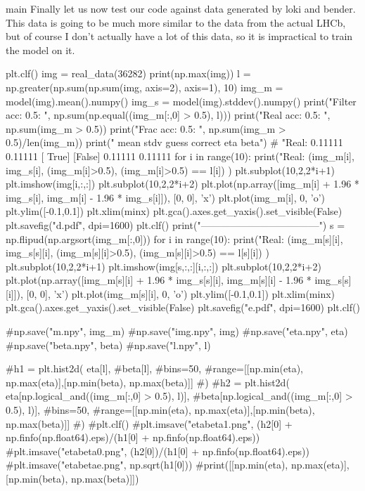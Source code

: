 \documentclass[10pt, a4paper]{article}
\begin{document}
\begin{codeblock}{main}
Finally let us now test our code against data generated by loki and bender. This data is going to be much more similar to the data from the actual LHCb, but of course I don't actually have a lot of this data, so it is impractical to train the model on it.

\begin{code}
	plt.clf()
	img = real_data(36282)
	print(np.max(img))
	l = np.greater(np.sum(np.sum(img, axis=2), axis=1), 10)
	img_m = model(img).mean().numpy()
	img_s = model(img).stddev().numpy()
	print("Filter acc: 0.5: ", np.sum(np.equal((img_m[:,0] > 0.5), l)))
	print("Real acc: 0.5: ", np.sum(img_m > 0.5))
	print("Frac acc: 0.5: ", np.sum(img_m > 0.5)/len(img_m))
	print("      mean    stdv    guess   correct eta     beta")
	#     "Real: 0.11111 0.11111 [ True] [False] 0.11111 0.11111 
	for i in range(10):
		print("Real: %
					(img_m[i], img_s[i], (img_m[i]>0.5), (img_m[i]>0.5) == l[i]) )
		plt.subplot(10,2,2*i+1)
		plt.imshow(img[i,:,:])
		plt.subplot(10,2,2*i+2)
		plt.plot(np.array([img_m[i] + 1.96 * img_s[i], img_m[i] - 1.96 * img_s[i]]), [0, 0], 'x')
		plt.plot(img_m[i], 0, 'o')
		plt.ylim([-0.1,0.1])
		plt.xlim(minx)
		plt.gca().axes.get_yaxis().set_visible(False)
	plt.savefig("d.pdf", dpi=1600)
	plt.clf()
	print("------------------------------------")
	s = np.flipud(np.argsort(img_m[:,0]))
	for i in range(10):
		print("Real: %
					(img_m[s][i], img_s[s][i], (img_m[s][i]>0.5), (img_m[s][i]>0.5) == l[s][i]) )
		plt.subplot(10,2,2*i+1)
		plt.imshow(img[s,:,:][i,:,:])
		plt.subplot(10,2,2*i+2)
		plt.plot(np.array([img_m[s][i] + 1.96 * img_s[s][i], img_m[s][i] - 1.96 * img_s[s][i]]), [0, 0], 'x')
		plt.plot(img_m[s][i], 0, 'o')
		plt.ylim([-0.1,0.1])
		plt.xlim(minx)
		plt.gca().axes.get_yaxis().set_visible(False)
	plt.savefig("e.pdf", dpi=1600)
	plt.clf()
	
	#np.save("m.npy", img_m)
	#np.save("img.npy", img)
	#np.save("eta.npy", eta)
	#np.save("beta.npy", beta)
	#np.save("l.npy", l)
	
	#h1 = plt.hist2d( eta[l],
	                #beta[l],
	                #bins=50,
	                #range=[[np.min(eta), np.max(eta)],[np.min(beta), np.max(beta)]]
	                #)
	#h2 = plt.hist2d( eta[np.logical_and((img_m[:,0] > 0.5), l)], 
	                #beta[np.logical_and((img_m[:,0] > 0.5), l)],
	                #bins=50,
	                #range=[[np.min(eta), np.max(eta)],[np.min(beta), np.max(beta)]]
	                #)
	#plt.clf()
	#plt.imsave("etabeta1.png", (h2[0] + np.finfo(np.float64).eps)/(h1[0] + np.finfo(np.float64).eps))
	#plt.imsave("etabeta0.png", (h2[0])/(h1[0] + np.finfo(np.float64).eps))
	#plt.imsave("etabetae.png", np.sqrt(h1[0]))
	#print([[np.min(eta), np.max(eta)],[np.min(beta), np.max(beta)]])
	

\end{code}
\end{codeblock}
\end{document}
